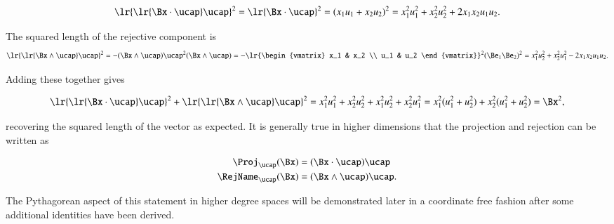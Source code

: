 \begin{dmath}\label{eqn:SimpleProducts2:740}
\lr{ \lr{\Bx \cdot \ucap } \ucap }^2
=
\lr{\Bx \cdot \ucap }^2
=
(x_1 u_1 + x_2 u_2)^2
=
x_1^2 u_1^2 + x_2^2 u_2^2 + 2 x_1 x_2 u_1 u_2.
\end{dmath}

The squared length of the rejective component is
\begin{dmath}\label{eqn:SimpleProducts2:760}
\lr{ \lr{\Bx \wedge \ucap } \ucap }^2
=
-(\Bx \wedge \ucap) \ucap^2 (\Bx \wedge \ucap)
=
-
\lr{\begin{vmatrix}
   x_1 & x_2 \\
   u_1 & u_2
\end{vmatrix}}^2
(\Be_1 \Be_2)^2
=
x_1^2 u_2^2 + x_2^2 u_1^2 - 2 x_1 x_2 u_1 u_2.
\end{dmath}

Adding these together gives

\begin{dmath}\label{eqn:SimpleProducts2:780}
\lr{ \lr{\Bx \cdot \ucap } \ucap }^2 + \lr{ \lr{\Bx \wedge \ucap } \ucap }^2
=
x_1^2 u_1^2 + x_2^2 u_2^2
+x_1^2 u_2^2 + x_2^2 u_1^2
=
x_1^2 ( u_1^2 + u_2^2 )
+
x_2^2 ( u_1^2 + u_2^2 )
=
\Bx^2,
\end{dmath}

recovering the squared length of the vector as expected.  It is generally true in higher dimensions that the projection and rejection can be written as

\begin{dmath}\label{eqn:SimpleProducts2:800}
\begin{aligned}
\Proj_\ucap(\Bx) &= (\Bx \cdot \ucap) \ucap \\
\RejName_\ucap(\Bx) &= (\Bx \wedge \ucap) \ucap.
\end{aligned}
\end{dmath}

The Pythagorean aspect of this statement in higher degree spaces 
will be demonstrated later in a coordinate free fashion after some additional identities have been derived.


